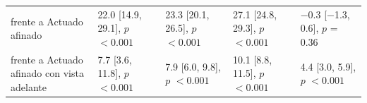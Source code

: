 \begin{table}[!t]
\begin{tabular}{@{}lllll@{}}
\quad frente a Actuado afinado & 22.0 [14.9, 29.1], $p$ $<\!0.001$ & 23.3 [20.1, 26.5], $p$ $<\!0.001$ & 27.1 [24.8, 29.3], $p$ $<\!0.001$ & $-$0.3 [$-$1.3, 0.6], $p$ = 0.36 \\
\quad frente a Actuado afinado con vista adelante & 7.7 [3.6, 11.8], $p$ $<\!0.001$ & 7.9 [6.0, 9.8], $p$ $<\!0.001$ & 10.1 [8.8, 11.5], $p$ $<\!0.001$ & 4.4 [3.0, 5.9], $p$ $<\!0.001$ \\
\bottomrule
\end{tabular}
\end{table}
